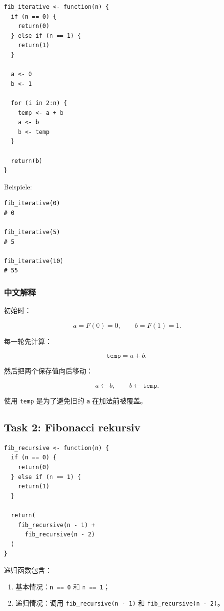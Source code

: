 \documentclass[11pt,a4paper]{ctexart}
\begin{document}
\begin{lstlisting}
fib_iterative <- function(n) {
  if (n == 0) {
    return(0)
  } else if (n == 1) {
    return(1)
  }

  a <- 0
  b <- 1

  for (i in 2:n) {
    temp <- a + b
    a <- b
    b <- temp
  }

  return(b)
}
\end{lstlisting}

Beispiele:

\begin{lstlisting}
fib_iterative(0)
# 0

fib_iterative(5)
# 5

fib_iterative(10)
# 55
\end{lstlisting}

\subsubsection*{中文解释}

初始时：

\[
a=F(0)=0,\qquad b=F(1)=1.
\]

每一轮先计算：

\[
\texttt{temp}=a+b,
\]

然后把两个保存值向后移动：

\[
a\leftarrow b,\qquad b\leftarrow \texttt{temp}.
\]

使用 \texttt{temp} 是为了避免旧的 \texttt{a} 在加法前被覆盖。

\subsection{Task 2: Fibonacci rekursiv}

\begin{lstlisting}
fib_recursive <- function(n) {
  if (n == 0) {
    return(0)
  } else if (n == 1) {
    return(1)
  }

  return(
    fib_recursive(n - 1) +
      fib_recursive(n - 2)
  )
}
\end{lstlisting}

递归函数包含：

\begin{enumerate}
  \item 基本情况：\texttt{n == 0} 和 \texttt{n == 1}；
  \item 递归情况：调用 \texttt{fib\_recursive(n - 1)} 和
  \texttt{fib\_recursive(n - 2)}。
\end{enumerate}
\end{document}
